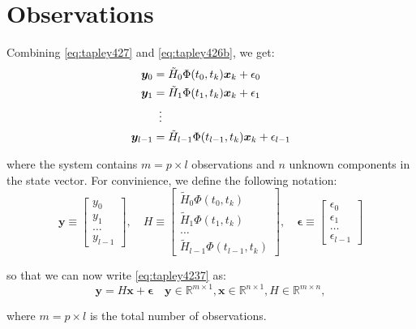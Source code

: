 \section{Observations}
Combining \ref{eq:tapley427} and \ref{eq:tapley426b}, we get:
\begin{equation}
	\label{eq:tapley4237}
	\begin{aligned}
		\bm{y}_0     & = \tilde{H}_0 \Phi (t_0, t_k) \bm{x}_k + {\epsilon}_0 \\
		\bm{y}_1     & = \tilde{H}_1 \Phi (t_1, t_k) \bm{x}_k + {\epsilon}_1  \\
		             & \vdotswithin{=} \\
		\bm{y}_{l-1} & = \tilde{H}_{l-1} \Phi (t_{l-1}, t_k) \bm{x}_k + {\epsilon}_{l-1}
	\end{aligned}
\end{equation}

where the system contains \(m=p\times l\) observations and \(n\) unknown components
in the state vector. For convinience, we define the following notation:
\begin{equation}
	\bm{y} \equiv \begin{bmatrix} y_0 \\ y_1 \\ \ldots \\ y_{l-1} \end{bmatrix},
	\quad
	H \equiv \begin{bmatrix} \tilde{H}_0 \Phi (t_0, t_k) \\ \tilde{H}_1 \Phi (t_1, t_k) \\ \ldots \\ \tilde{H}_{l-1} \Phi (t_{l-1}, t_k) \end{bmatrix},
	\quad
	\bm{\epsilon} \equiv \begin{bmatrix} {\epsilon}_0 \\ {\epsilon}_1 \\ \ldots \\ {\epsilon}_{l-1} \end{bmatrix}
\end{equation}

so that we can now write \ref{eq:tapley4237} as:
\begin{equation}
	\label{eq:tapley4239}
	\bm{y} = H \bm{x} + \bm{\epsilon}
	\quad
	\bm{y} \in \mathbb{R} ^{m \times 1},
	\bm{x} \in \mathbb{R} ^{n \times 1},
	H \in \mathbb{R}^{m \times n},
\end{equation}

where \( m = p \times l \) is the total number of observations.

